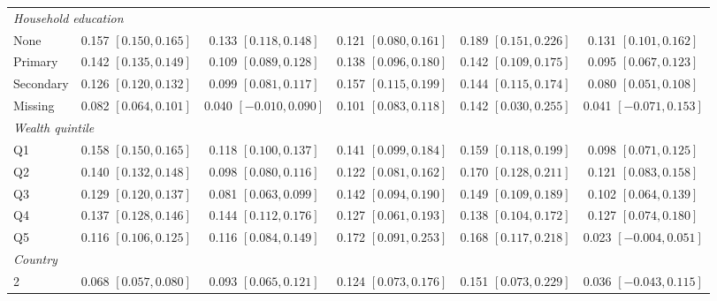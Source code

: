 \begin{landscape}
\begin{longtable}{lccccc}
\midrule
\multicolumn{6}{l}{\textit{Household education}} \\
None & 0.157 {\scriptsize$[0.150,0.165]$} & 0.133 {\scriptsize$[0.118,0.148]$} & 0.121 {\scriptsize$[0.080,0.161]$} & 0.189 {\scriptsize$[0.151,0.226]$} & 0.131 {\scriptsize$[0.101,0.162]$} \\
Primary & 0.142 {\scriptsize$[0.135,0.149]$} & 0.109 {\scriptsize$[0.089,0.128]$} & 0.138 {\scriptsize$[0.096,0.180]$} & 0.142 {\scriptsize$[0.109,0.175]$} & 0.095 {\scriptsize$[0.067,0.123]$} \\
Secondary & 0.126 {\scriptsize$[0.120,0.132]$} & 0.099 {\scriptsize$[0.081,0.117]$} & 0.157 {\scriptsize$[0.115,0.199]$} & 0.144 {\scriptsize$[0.115,0.174]$} & 0.080 {\scriptsize$[0.051,0.108]$} \\
Missing & 0.082 {\scriptsize$[0.064,0.101]$} & 0.040 {\scriptsize$[-0.010,0.090]$} & 0.101 {\scriptsize$[0.083,0.118]$} & 0.142 {\scriptsize$[0.030,0.255]$} & 0.041 {\scriptsize$[-0.071,0.153]$} \\
\midrule
\multicolumn{6}{l}{\textit{Wealth quintile}} \\
Q1 & 0.158 {\scriptsize$[0.150,0.165]$} & 0.118 {\scriptsize$[0.100,0.137]$} & 0.141 {\scriptsize$[0.099,0.184]$} & 0.159 {\scriptsize$[0.118,0.199]$} & 0.098 {\scriptsize$[0.071,0.125]$} \\
Q2 & 0.140 {\scriptsize$[0.132,0.148]$} & 0.098 {\scriptsize$[0.080,0.116]$} & 0.122 {\scriptsize$[0.081,0.162]$} & 0.170 {\scriptsize$[0.128,0.211]$} & 0.121 {\scriptsize$[0.083,0.158]$} \\
Q3 & 0.129 {\scriptsize$[0.120,0.137]$} & 0.081 {\scriptsize$[0.063,0.099]$} & 0.142 {\scriptsize$[0.094,0.190]$} & 0.149 {\scriptsize$[0.109,0.189]$} & 0.102 {\scriptsize$[0.064,0.139]$} \\
Q4 & 0.137 {\scriptsize$[0.128,0.146]$} & 0.144 {\scriptsize$[0.112,0.176]$} & 0.127 {\scriptsize$[0.061,0.193]$} & 0.138 {\scriptsize$[0.104,0.172]$} & 0.127 {\scriptsize$[0.074,0.180]$} \\
Q5 & 0.116 {\scriptsize$[0.106,0.125]$} & 0.116 {\scriptsize$[0.084,0.149]$} & 0.172 {\scriptsize$[0.091,0.253]$} & 0.168 {\scriptsize$[0.117,0.218]$} & 0.023 {\scriptsize$[-0.004,0.051]$} \\
\midrule
\multicolumn{6}{l}{\textit{Country}} \\
2 & 0.068 {\scriptsize$[0.057,0.080]$} & 0.093 {\scriptsize$[0.065,0.121]$} & 0.124 {\scriptsize$[0.073,0.176]$} & 0.151 {\scriptsize$[0.073,0.229]$} & 0.036 {\scriptsize$[-0.043,0.115]$} \\

\end{longtable}
\end{landscape}
